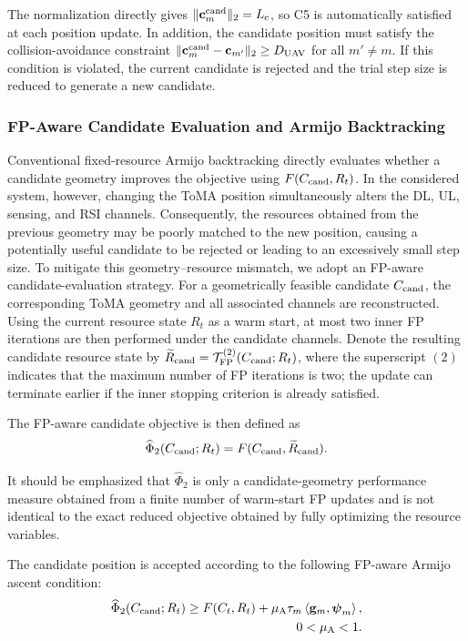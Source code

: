 \documentclass[letterpaper,journal]{IEEEtran}
\begin{document}
The normalization directly gives $\|\mathbf c_m^{\rm cand}\|_2=L_{\rm c}$, so C5 is automatically satisfied at each position update. In addition, the candidate position must satisfy the collision-avoidance constraint $\|\mathbf c_m^{\rm cand}-\mathbf c_{m'}\|_2\ge D_{\rm UAV}$ for all $m'\neq m$. If this condition is violated, the current candidate is rejected and the trial step size is reduced to generate a new candidate.

\subsubsection{FP-Aware Candidate Evaluation and Armijo Backtracking}

Conventional fixed-resource Armijo backtracking directly evaluates whether a candidate geometry improves the objective using $F(C_{\rm cand},R_t)$. In the considered system, however, changing the ToMA position simultaneously alters the DL, UL, sensing, and RSI channels. Consequently, the resources obtained from the previous geometry may be poorly matched to the new position, causing a potentially useful candidate to be rejected or leading to an excessively small step size. To mitigate this geometry--resource mismatch, we adopt an FP-aware candidate-evaluation strategy. For a geometrically feasible candidate $C_{\rm cand}$, the corresponding ToMA geometry and all associated channels are reconstructed. Using the current resource state $R_t$ as a warm start, at most two inner FP iterations are then performed under the candidate channels. Denote the resulting candidate resource state by $\widetilde R_{\rm cand}=\mathcal T_{\rm FP}^{(2)}(C_{\rm cand};R_t)$, where the superscript $(2)$ indicates that the maximum number of FP iterations is two; the update can terminate earlier if the inner stopping criterion is already satisfied.

The FP-aware candidate objective is then defined as
\begin{equation}
\widehat\Phi_2
(C_{\rm cand};R_t)
=
F
(C_{\rm cand},\widetilde R_{\rm cand}).
\label{eq:fpaware_candidate_objective}
\end{equation}

It should be emphasized that $\widehat\Phi_2$ is only a candidate-geometry performance measure obtained from a finite number of warm-start FP updates and is not identical to the exact reduced objective obtained by fully optimizing the resource variables.

The candidate position is accepted according to the following FP-aware Armijo ascent condition:
\begin{equation}
\begin{aligned}
\widehat\Phi_2
(C_{\rm cand};R_t)
\ge
F(C_t,R_t)
+
\mu_{\rm A}\tau_m
\left\langle
\mathbf g_m,\boldsymbol\psi_m
\right\rangle,
\\
0<\mu_{\rm A}<1.
\end{aligned}
\label{eq:fpaware_armijo}
\end{equation}
\end{document}
